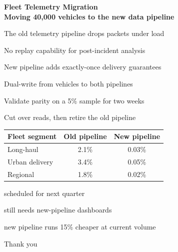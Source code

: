 \documentclass[16x9]{elpres}
\begin{document}
\begin{rsli}
  \begin{center}
    \Large\bfseries Fleet Telemetry Migration\\[1em]
    \normalsize\mdseries Moving 40{,}000 vehicles to the new data pipeline
  \end{center}
\end{rsli}

\begin{psli}
  \begin{citemize}
    \item The old telemetry pipeline drops packets under load
    \item No replay capability for post-incident analysis
    \item New pipeline adds exactly-once delivery guarantees
  \end{citemize}
\end{psli}

\begin{psli}
  \begin{cenumerate}
    \item Dual-write from vehicles to both pipelines
    \item Validate parity on a 5\% sample for two weeks
    \item Cut over reads, then retire the old pipeline
  \end{cenumerate}
\end{psli}

\begin{psli}
  \begin{center}
    \begin{tabular}{lcc}
      Fleet segment & Old pipeline & New pipeline \\
      \hline
      Long-haul & 2.1\% & 0.03\% \\
      Urban delivery & 3.4\% & 0.05\% \\
      Regional & 1.8\% & 0.02\% \\
    \end{tabular}
  \end{center}
\end{psli}

\begin{psli}
  \begin{cdescription}
    \item[Retire old pipeline] scheduled for next quarter
    \item[Alerting] still needs new-pipeline dashboards
    \item[Cost] new pipeline runs 15\% cheaper at current volume
  \end{cdescription}
\end{psli}

\begin{rsli}
  \begin{center}
    \Large Thank you
  \end{center}
\end{rsli}
\end{document}
